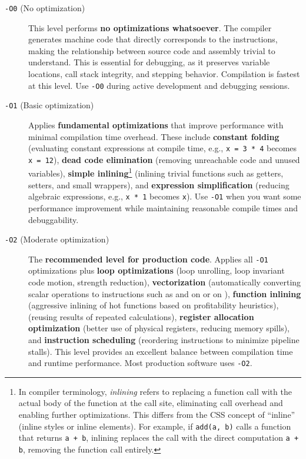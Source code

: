 \begin{description}
  \item[\texttt{-O0} (No optimization)] This level performs \textbf{no optimizations whatsoever}. The compiler generates machine code that directly corresponds to the  instructions, making the relationship between source code and assembly trivial to understand. This is essential for debugging, as it preserves variable locations, call stack integrity, and stepping behavior. Compilation is fastest at this level. Use \texttt{-O0} during active development and debugging sessions.

  \item[\texttt{-O1} (Basic optimization)] Applies \textbf{fundamental optimizations} that improve performance with minimal compilation time overhead. These include \textbf{constant folding} (evaluating constant expressions at compile time, e.g., \texttt{x = 3 * 4} becomes \texttt{x = 12}), \textbf{dead code elimination} (removing unreachable code and unused variables), \textbf{simple inlining}\footnote{In compiler terminology, \textit{inlining} refers to replacing a function call with the actual body of the function at the call site, eliminating call overhead and enabling further optimizations. This differs from the CSS concept of ``inline'' (inline styles or inline elements). For example, if \texttt{add(a, b)} calls a function that returns \texttt{a + b}, inlining replaces the call with the direct computation \texttt{a + b}, removing the function call entirely.} (inlining trivial functions such as getters, setters, and small wrappers), and \textbf{expression simplification} (reducing algebraic expressions, e.g., \texttt{x * 1} becomes \texttt{x}). Use \texttt{-O1} when you want some performance improvement while maintaining reasonable compile times and debuggability.

  \item[\texttt{-O2} (Moderate optimization)] The \textbf{recommended level for production code}. Applies all \texttt{-O1} optimizations plus \textbf{loop optimizations} (loop unrolling, loop invariant code motion, strength reduction), \textbf{vectorization} (automatically converting scalar operations to  instructions such as  and  on  or  on ), \textbf{function inlining} (aggressive inlining of hot functions based on profitability heuristics), \textbf{} (reusing results of repeated calculations), \textbf{register allocation optimization} (better use of physical registers, reducing memory spills), and \textbf{instruction scheduling} (reordering instructions to minimize  pipeline stalls). This level provides an excellent balance between compilation time and runtime performance. Most production software uses \texttt{-O2}.


\end{description}
